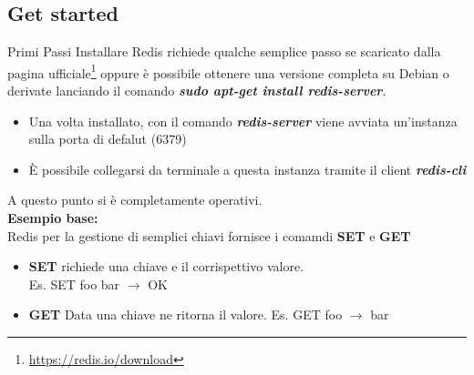 \documentclass[xcolor=dvipsnames]{beamer}
\begin{document}
      \subsection{Get started}
        \begin{frame}{Primi Passi}
          Installare Redis richiede qualche semplice passo se scaricato dalla pagina ufficiale\footnote{\url{https://redis.io/download}} oppure è possibile ottenere una versione completa su Debian o derivate lanciando il comando \textbf{\textit{sudo apt-get install redis-server}}.\\

          \begin{itemize}
            \item Una volta installato, con il comando \textbf{\textit{redis-server}} viene avviata un'instanza sulla porta di defalut (6379)
            \item È possibile collegarsi da terminale a questa instanza tramite il client \textbf{\textit{redis-cli}}
          \end{itemize}

          A questo punto si è completamente operativi.\\
          \textbf{Esempio base:}\\
          Redis per la gestione di semplici chiavi fornisce i comamdi \textbf{SET} e \textbf{GET}
          \begin{itemize}
            \item \textbf{SET} richiede una chiave e il corrispettivo valore.\\ Es. SET foo bar $\rightarrow$ OK
            \item \textbf{GET} Data una chiave ne ritorna il valore. Es. GET foo $\rightarrow$ bar
          \end{itemize}
        \end{frame}
\end{document}
